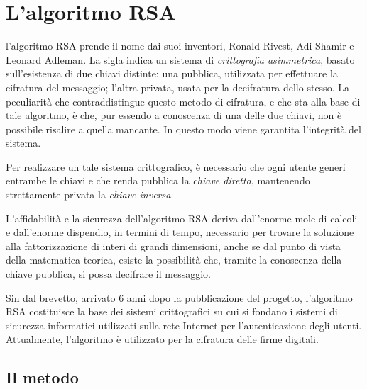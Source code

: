 
\chapter{L'algoritmo RSA}

 l'algoritmo RSA prende il nome dai suoi inventori, Ronald Rivest, Adi Shamir e Leonard Adleman. La sigla indica un sistema di \emph{crittografia asimmetrica}, basato sull'esistenza di due chiavi distinte: una pubblica, utilizzata per effettuare la cifratura del messaggio; l'altra privata, usata per la decifratura dello stesso. La peculiarità che contraddistingue questo metodo di cifratura, e che sta alla base di tale algoritmo, è che, pur essendo a conoscenza di una delle due chiavi, non è possibile risalire a quella mancante. In questo modo viene garantita l'integrità del sistema.

Per realizzare un tale sistema crittografico, è necessario che ogni utente generi entrambe le chiavi e che renda pubblica la \emph{chiave diretta}, mantenendo strettamente privata la \emph{chiave inversa}.

L'affidabilità e la sicurezza dell'algoritmo RSA deriva dall'enorme mole di calcoli e dall'enorme dispendio, in termini di tempo, necessario per trovare la soluzione alla fattorizzazione di interi di grandi dimensioni, anche se dal punto di vista della matematica teorica, esiste la possibilità che, tramite la conoscenza della chiave pubblica, si possa decifrare il messaggio.

Sin dal brevetto, arrivato 6 anni dopo la pubblicazione del progetto, l'algoritmo RSA costituisce la base dei sistemi crittografici su cui si fondano i sistemi di sicurezza informatici utilizzati sulla rete Internet per l'autenticazione degli utenti. Attualmente, l'algoritmo è utilizzato %
per la cifratura delle firme digitali.

%
\section{Il metodo}

